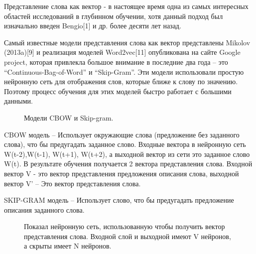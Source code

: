\documentclass[12pt]{article}
\begin{document}
Представление слова как вектор - в настоящее время одна из самых интересных областей исследований в глубинном обучении, хотя данный подход был изначально введен Bengio[1] и др. более десяти лет назад.

	Самый известные модели представления слова как вектор представлены Mikolov (2013a)[9] и реализация моделей Word2vec[11] опубликована на сайте Google project, которая привлекла большое внимание в последние два года – это “Continuous-Bag-of-Word” и “Skip-Gram”. Эти модели использовали простую нейронную сеть для отображения слов, которые ближе к слову по значению. Поэтому процесс обучения для этих моделей быстро работает с большими данными. 
	
	\begin{figure}[H]
		\noindent{}
		\caption{Модели CBOW и Skip-gram.}
		\label{figCurves}
	\end{figure}
	
CBOW модель – Использует окружающие слова (предложение без заданного слова), что бы предугадать заданное слово. Входные вектора в нейронную сеть W(t-2),W(t-1), W(t+1), W(t+2), а выходной вектор из сети это заданное слово W(t). В результате обучения получается 2 вектора представления слова. Входной вектор V - это вектор представления предложения описания слова, выходной вектор V’ – Это вектор представления слова.

SKIP-GRAM модель – Использует слово, что бы предугадать предложение описания заданного слова.

 	\begin{figure}[H]
		\noindent{}
		\caption{Показал нейронную сеть, использованную чтобы получить вектор представления слова. Входной слой и выходной имеют V нейронов, а скрыты имеет N нейронов.}
		\label{figCurves}
	\end{figure}
\end{document}
